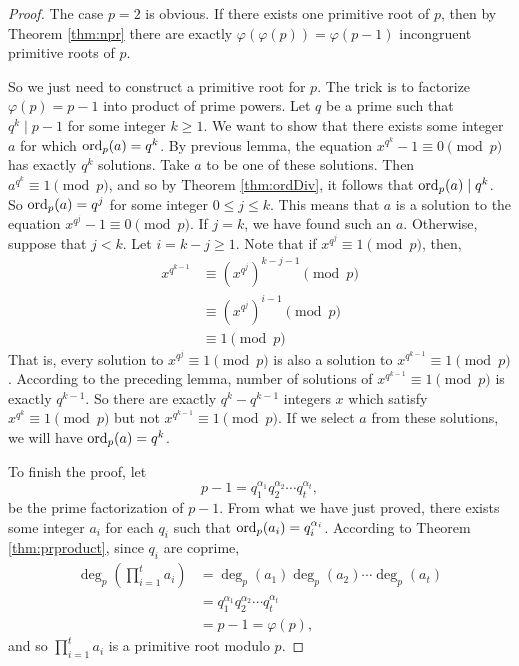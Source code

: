 \documentclass{subfile}
\begin{document}
	\begin{proof}
		The case $p=2$ is obvious. If there exists one primitive root of $p$, then by Theorem \ref{thm:npr} there are exactly $\varphi(\varphi(p))=\varphi(p-1)$ incongruent primitive roots of $p$.

		So we just need to construct a primitive root for $p$. The trick is to factorize $\varphi(p)=p-1$ into product of prime powers. Let $q$ be a prime such that $q^k \mid p-1$ for some integer $k \geq 1$. We want to show that there exists some integer $a$ for which $\operatorname{ord}_p(a)=q^k$. By previous lemma, the equation $x^{q^k} - 1 \equiv 0 \pmod p$ has exactly $q^k$ solutions. Take $a$ to be one of these solutions. Then $a^{q^k} \equiv 1 \pmod p$, and so by Theorem \ref{thm:ordDiv}, it follows that $\operatorname{ord}_p(a)\mid q^k$. So $\operatorname{ord}_p(a)=q^j$ for some integer $0 \leq j \leq k$. This means that $a$ is a solution to the equation $x^{q^j} - 1 \equiv 0 \pmod p$. If $j=k$, we have found such an $a$. Otherwise, suppose that $j<k$. Let $i=k-j\geq 1$. Note that if $x^{q^j} \equiv 1 \pmod p$, then,
			\begin{align*}
				x^{q^{k-1}}
					& \equiv \left(x^{q^j}\right)^{k-j-1}\pmod{p}\\
					& \equiv \left(x^{q^j}\right)^{i-1}\pmod{p}\\
					& \equiv 1 \pmod p
			\end{align*}
		That is, every solution to $x^{q^j} \equiv 1 \pmod p$ is also a solution to $x^{q^{k-1}} \equiv 1 \pmod p$. According to the preceding lemma, number of solutions of $x^{q^{k-1}} \equiv 1 \pmod p$ is exactly $q^{k-1}$. So there are exactly $q^k - q^{k-1}$ integers $x$ which satisfy $x^{q^k} \equiv 1 \pmod p$ but not $x^{q^{k-1}} \equiv 1 \pmod p$. If we select $a$ from these solutions, we will have $\operatorname{ord}_p(a)=q^k$.

		To finish the proof, let $$p-1 = q_1^{\alpha_1}q_2^{\alpha_2} \cdots q_t^{\alpha_t},$$ be the prime factorization of $p-1$. From what we have just proved, there exists some integer $a_i$ for each $q_i$ such that $\operatorname{ord}_p(a_i)=q_i^{\alpha_i}$. According to Theorem \eqref{thm:prproduct}, since $q_i$ are coprime,
			\begin{align*}
				\deg_p\left(\prod_{i=1}^{t}a_i\right)
					&=\deg_p(a_1) \deg_p(a_2) \cdots \deg_p(a_t)\\
					& =q_1^{\alpha_1}q_2^{\alpha_2} \cdots q_t^{\alpha_t}\\
					& = p-1 =\varphi(p),
			\end{align*}
		and so $\prod_{i=1}^{t}a_i$ is a primitive root modulo $p$.
	\end{proof}
\end{document}
